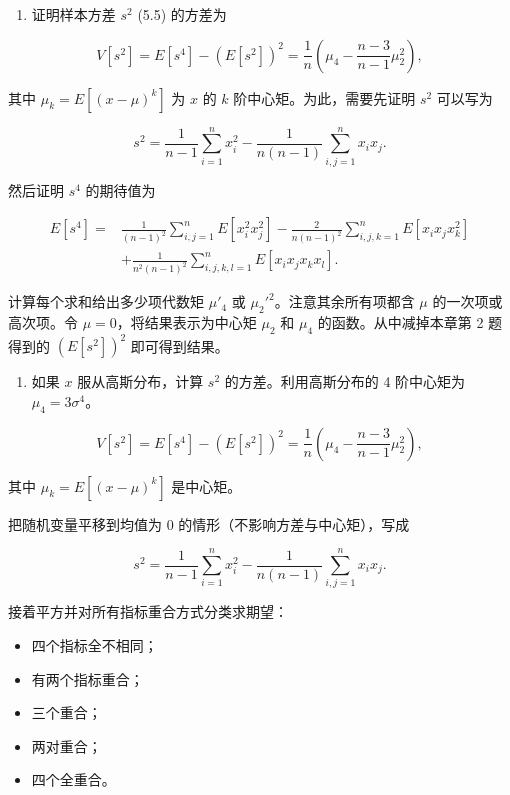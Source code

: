\begin{question}
\begin{enumerate}
\item
  证明样本方差 \(s^2\) (5.5) 的方差为
\end{enumerate}

\[
V[s^2]=E[s^4]-(E[s^2])^2=\frac1n\left(\mu_4-\frac{n-3}{n-1}\mu_2^2\right),
\]

其中 \(\mu_k=E[(x-\mu)^k]\) 为 \(x\) 的 \(k\) 阶中心矩。为此，需要先证明
\(s^2\) 可以写为

\[
s^2=\frac{1}{n-1}\sum_{i=1}^{n}x_i^2-\frac{1}{n(n-1)}\sum_{i,j=1}^{n}x_ix_j.
\]

然后证明 \(s^4\) 的期待值为

\[
\begin{split}
E[s^4]=&\frac{1}{(n-1)^2}\sum_{i,j=1}^{n}E[x_i^2x_j^2]
-\frac{2}{n(n-1)^2}\sum_{i,j,k=1}^{n}E[x_ix_jx_k^2]\\
&+\frac{1}{n^2(n-1)^2}\sum_{i,j,k,l=1}^{n}E[x_ix_jx_kx_l].
\end{split}
\]

计算每个求和给出多少项代数矩 \(\mu'_4\) 或
\(\mu_2'^2\)。注意其余所有项都含 \(\mu\) 的一次项或高次项。令
\(\mu=0\)，将结果表示为中心矩 \(\mu_2\) 和 \(\mu_4\)
的函数。从中减掉本章第 2 题得到的 \((E[s^2])^2\) 即可得到结果。

\begin{enumerate}[start=2]
\item
  如果 \(x\) 服从高斯分布，计算 \(s^2\) 的方差。利用高斯分布的 4
  阶中心矩为 \(\mu_4=3\sigma^4\)。
\end{enumerate}
\begin{solution}
\[
V[s^2]=E[s^4]-(E[s^2])^2=
\frac1n\left(\mu_4-\frac{n-3}{n-1}\mu_2^2\right),
\]

其中 \(\mu_k=E[(x-\mu)^k]\) 是中心矩。

把随机变量平移到均值为 0 的情形（不影响方差与中心矩），写成

\[
s^2=\frac1{n-1}\sum_{i=1}^n x_i^2-
\frac1{n(n-1)}\sum_{i,j=1}^n x_ix_j.
\]

接着平方并对所有指标重合方式分类求期望：

\begin{itemize}
\item
  四个指标全不相同；
\item
  有两个指标重合；
\item
  三个重合；
\item
  两对重合；
\item
  四个全重合。
\end{itemize}


\end{solution}
\end{question}
